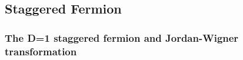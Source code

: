 \begin{comment}
\subsubsection{\label{sec:Z4_fermion}Z4 pseudo fermion}

In the pseudo-fermion approach, $\phi$ is a complex scalar field. However, it can also been viewed as a mathematical tool. To see this, what we are in fact evaluating is
\begin{equation}
\begin{split}
&\int \mathcal{D}\phi \mathcal{D}\phi^{\dagger} \exp (-\phi ^{\dagger}\left(DD^{\dagger}\right)^{-1}\phi )\\
\end{split}
\end{equation}
Let $\chi = D^{-1}\phi$, $\phi$ is a linear function of $\chi$, one have
\begin{equation}
\begin{split}
&\phi=D\chi,\;\;\frac{\partial \phi _i}{\partial \chi _j}=\left(D\right)_{ji},\\
&\mathcal{D}\phi \to \det \left[D\right]\mathcal{D}\chi,\;\;\mathcal{D}\phi^{\dagger} \to \det \left[D^{\dagger}\right]\mathcal{D}\chi^{\dagger}\\
\end{split}
\end{equation}
It becomes
\begin{equation}
\begin{split}
&\det[DD^{\dagger}]\int \mathcal{D}\chi \mathcal{D}\chi^{\dagger} \exp (-\chi ^{\dagger}\chi )\\
\end{split}
\end{equation}
\end{comment}

\subsection{\label{sec:staggered_fermion}Staggered Fermion}

\subsubsection{\label{sec:jordanWigner1D}The D=1 staggered fermion and Jordan-Wigner transformation}

